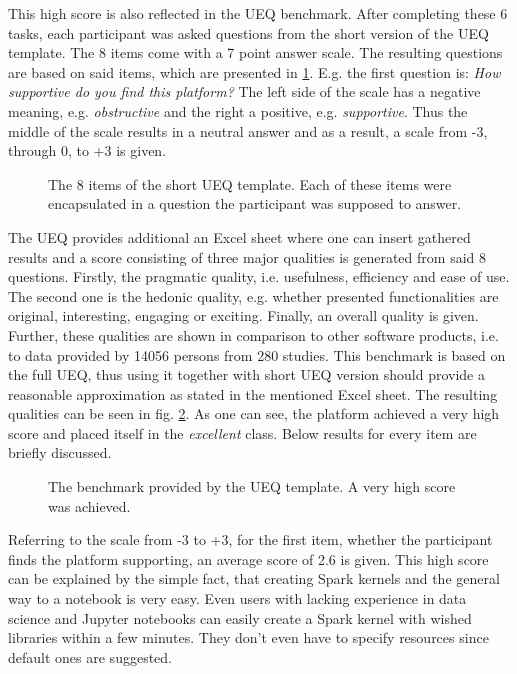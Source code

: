 \documentclass[a4paper,twoside]{article}
\begin{document}
This high score is also reflected in the UEQ benchmark. After completing these 6 tasks, each participant was asked questions from the short version of the UEQ template. The 8 items come with a 7 point answer scale. The resulting questions are based on said items, which are presented in \ref{fig:eva_ueq_general}. E.g. the first question is: \textit{How supportive do you find this platform?} The left side of the scale has a negative meaning, e.g. \textit{obstructive} and the right a positive, e.g. \textit{supportive}. Thus the middle of the scale results in a neutral answer and as a result, a scale from -3, through 0, to +3 is given.

\begin{figure}[!h]
  \centering
   {}
  \caption{The 8 items of the short UEQ template. Each of these items were encapsulated in a question the participant was supposed to answer.}
  \label{fig:eva_ueq_general}
\end{figure}

The UEQ provides additional an Excel sheet where one can insert gathered results and a score consisting of three major qualities is generated from said 8 questions. Firstly, the pragmatic quality, i.e. usefulness, efficiency and ease of use. The second one is the hedonic quality, e.g. whether presented functionalities are original, interesting, engaging or exciting. Finally, an overall quality is given. Further, these qualities are shown in comparison to other software products, i.e. to data provided by 14056 persons from 280 studies. This benchmark is based on the full UEQ, thus using it together with short UEQ version should provide a reasonable approximation as stated in the mentioned Excel sheet. The resulting qualities can be seen in fig. \ref{fig:eva_ueg}. As one can see, the platform achieved a very high score and placed itself in the \textit{excellent} class. Below results for every item are briefly discussed.

\begin{figure}[!h]
  \centering
   {}
  \caption{The benchmark provided by the UEQ template. A very high score was achieved.}
  \label{fig:eva_ueg}
\end{figure}

Referring to the scale from -3 to +3, for the first item, whether the participant finds the platform supporting, an average score of 2.6 is given. This high score can be explained by the simple fact, that creating Spark kernels and the general way to a notebook is very easy. Even users with lacking experience in data science and Jupyter notebooks can easily create a Spark kernel with wished libraries within a few minutes. They don't even have to specify resources since default ones are suggested. 
\end{document}
